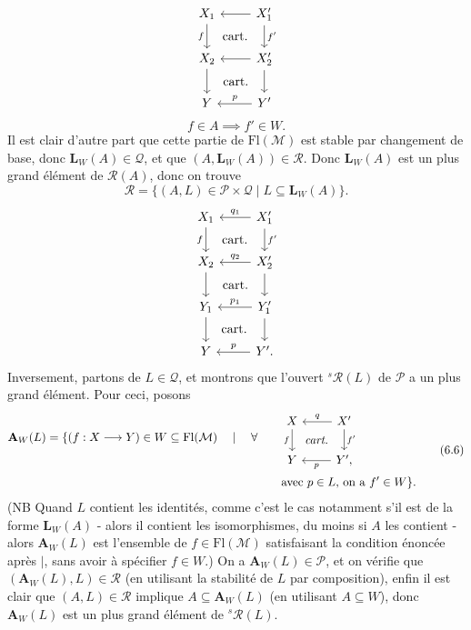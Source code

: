 \documentclass[11pt]{article}
\newcommand{\printedpage}[1]{\marginpar{\footnotesize p.~#1}}
\newcommand{\Fl}{\mathrm{Fl}}
\begin{document}
\[
\begin{tikzcd}
X_1 \arrow[d, "f"'] \arrow[dr, phantom, "\text{cart.}"] & X'_1 \arrow[l] \arrow[d, "f'"] \\
X_2 \arrow[d] \arrow[dr, phantom, "\text{cart.}"] & X'_2 \arrow[l] \arrow[d] \\
Y & Y' \arrow[l, "p"']
\end{tikzcd}
\]
\[
f\in A\implies f'\in W.
\]
Il est clair d'autre part que cette partie de $\Fl(\mathcal{M})$ est stable par changement de base, donc $\mathbf{L}_W(A)\in\mathcal{Q}$, et que $(A,\mathbf{L}_W(A))\in\mathcal{R}$. Donc $\mathbf{L}_W(A)$ est un plus grand élément de $\mathcal{R}(A)$, donc on trouve
\[
\mathcal{R}=\{(A,L)\in\mathcal{P}\times\mathcal{Q}\mid L\subseteq\mathbf{L}_W(A)\}.
\tag*{(6.5)}
\]
\printedpage{53}
\[
\begin{tikzcd}
X_1 \arrow[d, "f"'] \arrow[dr, phantom, "\text{cart.}"] & X'_1 \arrow[l, "q_1"'] \arrow[d, "f'"] \\
X_2 \arrow[d] \arrow[dr, phantom, "\text{cart.}"] & X'_2 \arrow[l, "q_2"'] \arrow[d] \\
Y_1 \arrow[d] \arrow[dr, phantom, "\text{cart.}"] & Y'_1 \arrow[l, "p_1"'] \arrow[d] \\
Y & Y'. \arrow[l, "p"']
\end{tikzcd}
\]
Inversement, partons de $L\in\mathcal{Q}$, et montrons que l'ouvert ${}^{s}\mathcal{R}(L)$ de $\mathcal{P}$ a un plus grand élément. Pour ceci, posons
\[
\begin{aligned}
\mathbf{A}_W(L)=\{(f : X\longrightarrow Y)\in W\subseteq\Fl(\mathcal{M})\quad\mid\quad\forall\qquad
&\begin{tikzcd}[ampersand replacement=\&]
X \arrow[d, "f"'] \arrow[dr, phantom, "\textit{cart.}"] \& X' \arrow[l, "q"'] \arrow[d, "f'"] \\
Y \& Y', \arrow[l, "p"]
\end{tikzcd}\\
&\text{avec $p\in L$, on a $f'\in W$}\}.
\end{aligned}
\tag*{(6.6)}
\]
(NB Quand $L$ contient les identités, comme c'est le cas notamment s'il est de la forme $\mathbf{L}_W(A)$ - alors il contient les isomorphismes, du moins si $A$ les contient - alors $\mathbf{A}_W(L)$ est l'ensemble de $f\in\Fl(\mathcal{M})$ satisfaisant la condition énoncée après $|$, sans avoir à spécifier $f\in W$.) On a $\mathbf{A}_W(L)\in\mathcal{P}$, et on vérifie que $(\mathbf{A}_W(L),L)\in\mathcal{R}$ (en utilisant la stabilité de $L$ par composition), enfin il est clair que $(A,L)\in\mathcal{R}$ implique $A\subseteq\mathbf{A}_W(L)$ (en utilisant $A\subseteq W$), donc $\mathbf{A}_W(L)$ est un plus grand élément de ${}^{s}\mathcal{R}(L)$.
\end{document}
